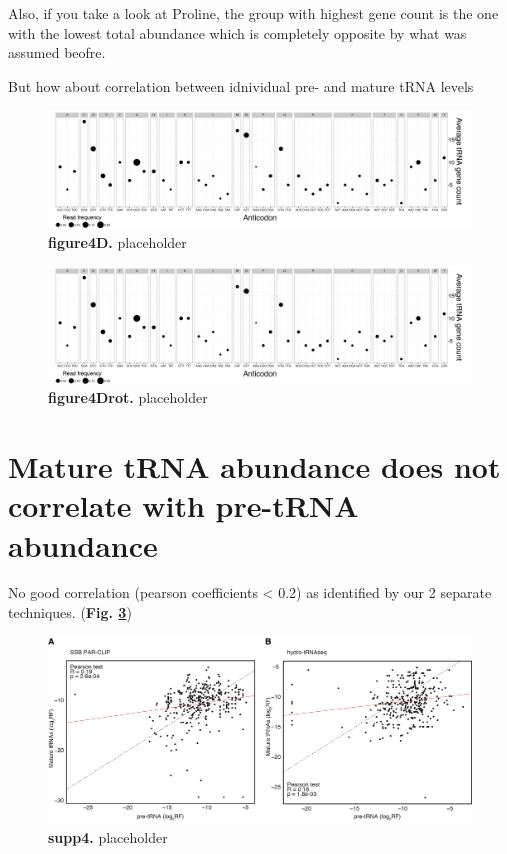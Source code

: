 \documentclass[12pt]{rockefeller}
\begin{document}
Also, if you take a look at Proline, the group with highest gene count is the one with the lowest total abundance which is completely opposite by what was assumed beofre. 

But how about correlation between idnividual pre- and mature tRNA levels 

\begin{figure}[!ht]%
\centering
\includegraphics[width=\textwidth]{paper4D.png}%
\caption[figure4D]
{\textbf{figure4D.}
placeholder}
\centering
\label{paper4}%
\end{figure}

\begin{figure}[!ht]%
\centering
\includegraphics[width=\textwidth, angle=90]{paper4Drot.png}%
\caption[figure4Drot]
{\textbf{figure4Drot.}
placeholder}
\centering
\label{paper4Drot}%
\end{figure}	

\section{Mature tRNA abundance does not correlate with pre-tRNA abundance}
No good correlation (pearson coefficients < 0.2) as identified by our 2 separate techniques. (\textbf{Fig. \ref{supp4}})

\begin{figure}[!ht]%
\centering
\includegraphics[width=\textwidth]{supp4.png}%
\caption[supp4]
{\textbf{supp4.}
placeholder}
\centering
\label{supp4}%
\end{figure}	
\end{document}
